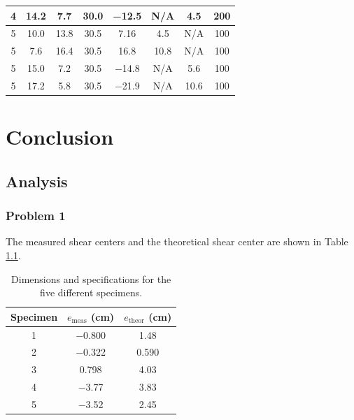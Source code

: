 \documentclass[12 pt]{report}
\begin{document}
\begin{table}[!htbp]
\begin{center}
\begin{tabular}{|c|c|c|c|c|c|c|c|}
		\hline
		\num{4}&\num{14.2}&\num{7.7}&\num{30.0}&\num{-12.5}&N/A&\num{4.5}&\num{200}\\
		\hline
		\num{5}&\num{10.0}&\num{13.8}&\num{30.5}&\num{7.16}&\num{4.5}&N/A&\num{100}\\
		\hline
		\num{5}&\num{7.6}&\num{16.4}&\num{30.5}&\num{16.8}&\num{10.8}&N/A&\num{100}\\
		\hline
		\num{5}&\num{15.0}&\num{7.2}&\num{30.5}&\num{-14.8}&N/A&\num{5.6}&\num{100}\\
		\hline
		\num{5}&\num{17.2}&\num{5.8}&\num{30.5}&\num{-21.9}&N/A&\num{10.6}&\num{100}\\
		\hline
	\end{tabular}
\end{center}
\label{tbl:data}
\end{table}

\chapter{Conclusion} \label{conclusion-chapter}
\section{Analysis} \label{analysis}
\subsection{Problem 1}
The measured shear centers and the theoretical shear center are shown in Table \ref{tbl:shear_centers}.

\begin{table}[!htbp]
\caption{Dimensions and specifications for the five different specimens.}
\begin{center}
	\begin{tabular}{|c|c|c|}
		\hline
		Specimen&$e_\text{meas}$ (\unit{cm})&$e_\text{theor}$  (\unit{cm})\\
		\hline
		1&\num{-0.800}&\num{1.48}\\
		\hline
		2&\num{-0.322}&\num{0.590}\\
		\hline
		3&\num{0.798}&\num{4.03}\\
		\hline
		4&\num{-3.77}&\num{3.83}\\
		\hline
		5&\num{-3.52}&\num{2.45}\\
		\hline
	\end{tabular}
\end{center}
\label{tbl:shear_centers}
\end{table}
\end{document}
